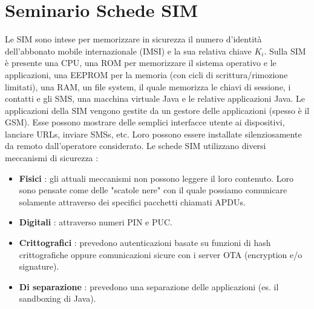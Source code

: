 \chapter{Seminario Schede SIM}
Le SIM sono intese per memorizzare in sicurezza il numero d'identità dell'abbonato mobile internazionale (IMSI) e la sua relativa chiave $K_i$. Sulla SIM è presente una CPU, una ROM per memorizzare il sistema operativo e le applicazioni, una EEPROM per la memoria (con cicli di scrittura/rimozione limitati), una RAM, un file system, il quale memorizza le chiavi di sessione, i contatti e gli SMS, una macchina virtuale Java e le relative applicazioni Java. Le applicazioni della SIM vengono gestite da un gestore delle applicazioni (spesso è il GSM). Esse possono mostrare delle semplici interfacce utente ai dispositivi, lanciare URLs, inviare SMSs, etc. Loro possono essere installate silenziosamente da remoto dall'operatore considerato. Le schede SIM utilizzano diversi meccanismi di sicurezza :
\begin{itemize}
\item \textbf{Fisici} : gli attuali meccanismi non possono leggere il loro contenuto. Loro sono pensate come delle "scatole nere" con il quale possiamo comunicare solamente attraverso dei specifici pacchetti chiamati APDUs.
\item \textbf{Digitali} : attraverso numeri PIN e PUC.
\item \textbf{Crittografici} : prevedono autenticazioni basate su funzioni di hash crittografiche oppure comunicazioni sicure con i server OTA (encryption e/o signature).
\item \textbf{Di separazione} : prevedono una separazione delle applicazioni (es. il sandboxing di Java).
\end{itemize}
